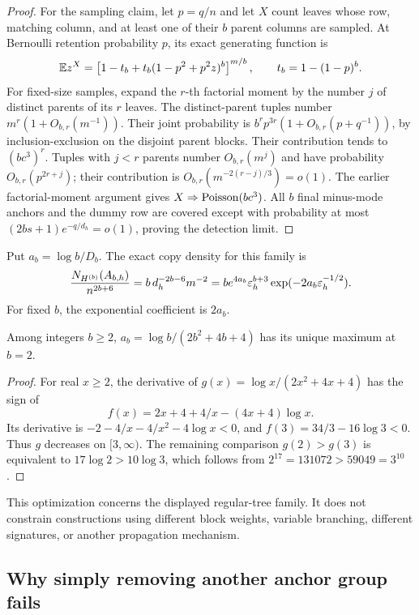 \begin{proof}
For the sampling claim, let \(p=q/n\) and let \(X\) count leaves
whose row, matching column, and at least one of their \(b\) parent
columns are sampled. At Bernoulli retention probability \(p\), its
exact generating function is
\begin{equation}
 \mathbb E z^X=\left[1-t_b+t_b(1-p^2+p^2z)^b\right]^{m/b},
 \qquad t_b=1-(1-p)^b.
 \label{eq:bary-pgf}
\end{equation}
For fixed-size samples, expand the \(r\)-th factorial moment by
the number \(j\) of distinct parents of its \(r\) leaves.
The distinct-parent tuples number \(m^r(1+O_{b,r}(m^{-1}))\).
Their joint probability is
\(b^r p^{3r}(1+O_{b,r}(p+q^{-1}))\), by inclusion-exclusion on
the disjoint parent blocks. Their contribution tends to
\((bc^3)^r\). Tuples with \(j<r\) parents number \(O_{b,r}(m^j)\)
and have probability \(O_{b,r}(p^{2r+j})\); their contribution is
\(O_{b,r}(m^{-2(r-j)/3})=o(1)\). The earlier factorial-moment
argument gives \(X\Rightarrow\operatorname{Poisson}(bc^3)\). All \(b\) final
minus-mode anchors and the dummy row are covered except with
probability at most \((2bs+1)e^{-q/d_h}=o(1)\), proving the
detection limit.
\end{proof}

Put \(a_b=\log b/D_b\). The exact copy density for this family is
\[
 \frac{N_{H^{(b)}}(A_{b,h})}{n^{2b+6}}
 =b\,d_h^{-2b-6}m^{-2}
 =b e^{4a_b}\varepsilon_h^{b+3}
       \exp(-2a_b\varepsilon_h^{-1/2}).
\]
For fixed \(b\), the exponential coefficient is \(2a_b\).

\begin{proposition}
\label{prop:binary-optimal}
Among integers \(b\ge2\), \(a_b=\log b/(2b^2+4b+4)\) has its
unique maximum at \(b=2\).
\end{proposition}
\begin{proof}
For real \(x\ge2\), the derivative of
\(g(x)=\log x/(2x^2+4x+4)\) has the sign of
\[
 f(x)=2x+4+4/x-(4x+4)\log x.
\]
Its derivative is \(-2-4/x-4/x^2-4\log x<0\), and
\(f(3)=34/3-16\log3<0\). Thus \(g\) decreases on \([3,\infty)\).
The remaining comparison \(g(2)>g(3)\) is equivalent to
\(17\log2>10\log3\), which follows from
\(2^{17}=131072>59049=3^{10}\).
\end{proof}

This optimization concerns the displayed regular-tree family. It does
not constrain constructions using different block weights, variable
branching, different signatures, or another propagation mechanism.

\subsection{Why simply removing another anchor group fails}


